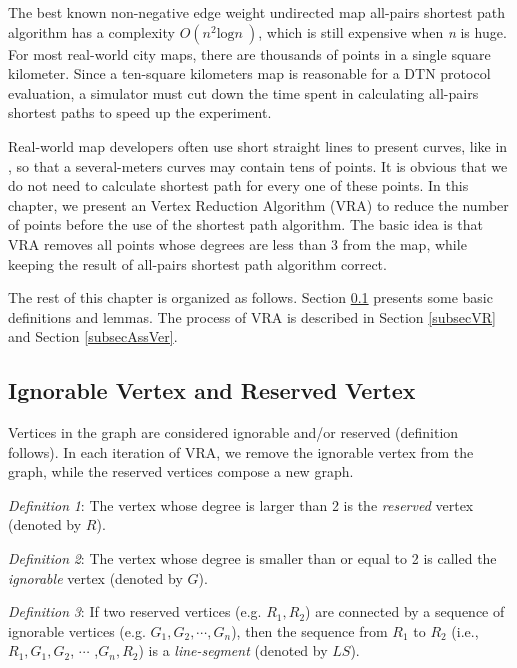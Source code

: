 The best known non-negative edge weight undirected map all-pairs shortest path algorithm \cite{C33} has a complexity $O\left(n^2{\mathrm{log} n\ }\right)$, which is still expensive when \textit{n} is huge. For most real-world city maps, there are thousands of points in a single square kilometer. Since a ten-square kilometers map is reasonable for a DTN protocol evaluation, a simulator must cut down the time spent in calculating all-pairs shortest paths to speed up the experiment.

Real-world map developers often use short straight lines to present curves, like in \cite{C34}, so that a several-meters curves may contain tens of points. It is obvious that we do not need to calculate shortest path for every one of these points. In this chapter, we present an Vertex Reduction Algorithm (VRA) to reduce the number of points before the use of the shortest path algorithm. The basic idea is that VRA removes all points whose degrees are less than 3 from the map, while keeping the result of all-pairs shortest path algorithm correct.

The rest of this chapter is organized as follows. Section \ref{subsecIVRV} presents some basic definitions and lemmas. The process of VRA is described in Section \ref{subsecVR} and Section \ref{subsecAssVer}.



\subsection{ Ignorable Vertex and Reserved Vertex}\label{subsecIVRV}

\noindent Vertices in the graph are considered ignorable and/or reserved (definition follows). In each iteration of VRA, we remove the ignorable vertex from the graph, while the reserved vertices compose a new graph.

\textit{Definition} \textit{1}: The vertex whose degree is larger than 2 is the \textit{reserved} vertex (denoted by $R$).

\textit{Definition} \textit{2}: The vertex whose degree is smaller than or equal to 2 is called the \textit{ignorable} vertex (denoted by $G$).

\textit{Definition} \textit{3}: If two reserved vertices (e.g. $R_1,R_2$) are connected by a sequence of ignorable vertices (e.g. $G_1,G_2,\mathrm{\cdots },G_n$), then the sequence from $R_1$ to $R_2$ (i.e., $R_1,G_1,G_2$, $\mathrm{\cdots }$ ,$G_n,R_2$) is a \textit{line-segment} (denoted by $LS$). 

